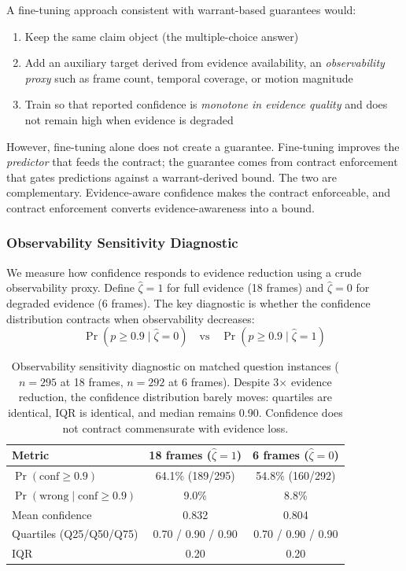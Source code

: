 \documentclass{article}
\begin{document}
A fine-tuning approach consistent with warrant-based guarantees would:
\begin{enumerate}
    \item Keep the same claim object (the multiple-choice answer)
    \item Add an auxiliary target derived from evidence availability, an \emph{observability proxy} such as frame count, temporal coverage, or motion magnitude
    \item Train so that reported confidence is \emph{monotone in evidence quality} and does not remain high when evidence is degraded
\end{enumerate}

However, fine-tuning alone does not create a guarantee. Fine-tuning improves the \emph{predictor} that feeds the contract; the guarantee comes from contract enforcement that gates predictions against a warrant-derived bound. The two are complementary. Evidence-aware confidence makes the contract enforceable, and contract enforcement converts evidence-awareness into a bound.

\subsubsection{Observability Sensitivity Diagnostic}

We measure how confidence responds to evidence reduction using a crude observability proxy. Define $\hat{\zeta} = 1$ for full evidence (18 frames) and $\hat{\zeta} = 0$ for degraded evidence (6 frames). The key diagnostic is whether the confidence distribution contracts when observability decreases:
\[
\Pr(p \geq 0.9 \mid \hat{\zeta} = 0) \quad \text{vs} \quad \Pr(p \geq 0.9 \mid \hat{\zeta} = 1)
\]

\begin{table}[h]
\centering
\small
\begin{tabular}{lcc}
\toprule
Metric & 18 frames ($\hat{\zeta}=1$) & 6 frames ($\hat{\zeta}=0$) \\
\midrule
$\Pr(\text{conf} \geq 0.9)$ & 64.1\% (189/295) & 54.8\% (160/292) \\
$\Pr(\text{wrong} \mid \text{conf} \geq 0.9)$ & 9.0\% & 8.8\% \\
Mean confidence & 0.832 & 0.804 \\
Quartiles (Q25/Q50/Q75) & 0.70 / 0.90 / 0.90 & 0.70 / 0.90 / 0.90 \\
IQR & 0.20 & 0.20 \\
\bottomrule
\end{tabular}
\caption{\small Observability sensitivity diagnostic on matched question instances ($n=295$ at 18 frames, $n=292$ at 6 frames). Despite 3$\times$ evidence reduction, the confidence distribution barely moves: quartiles are identical, IQR is identical, and median remains 0.90. Confidence does not contract commensurate with evidence loss.}
\label{tab:warrant}
\end{table}
\end{document}
